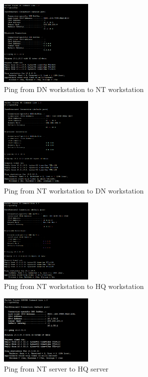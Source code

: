 \begin{figure}[H]
  \centering
  \includegraphics[width=0.4\textwidth]{./assets/ping.dnw-ntw.png}
  \caption{Ping from DN workstation to NT workstation}
\end{figure}

\begin{figure}[H]
  \centering
  \includegraphics[width=0.4\textwidth]{./assets/ping.ntw-dnw.png}
  \caption{Ping from NT workstation to DN workstation}
\end{figure}

\begin{figure}[H]
  \centering
  \includegraphics[width=0.4\textwidth]{./assets/ping.ntw-hqw.png}
  \caption{Ping from NT workstation to HQ workstation}
\end{figure}

\begin{figure}[H]
  \centering
  \includegraphics[width=0.4\textwidth]{./assets/ping.nts-hqs.png}
  \caption{Ping from NT server to HQ server}
\end{figure}

